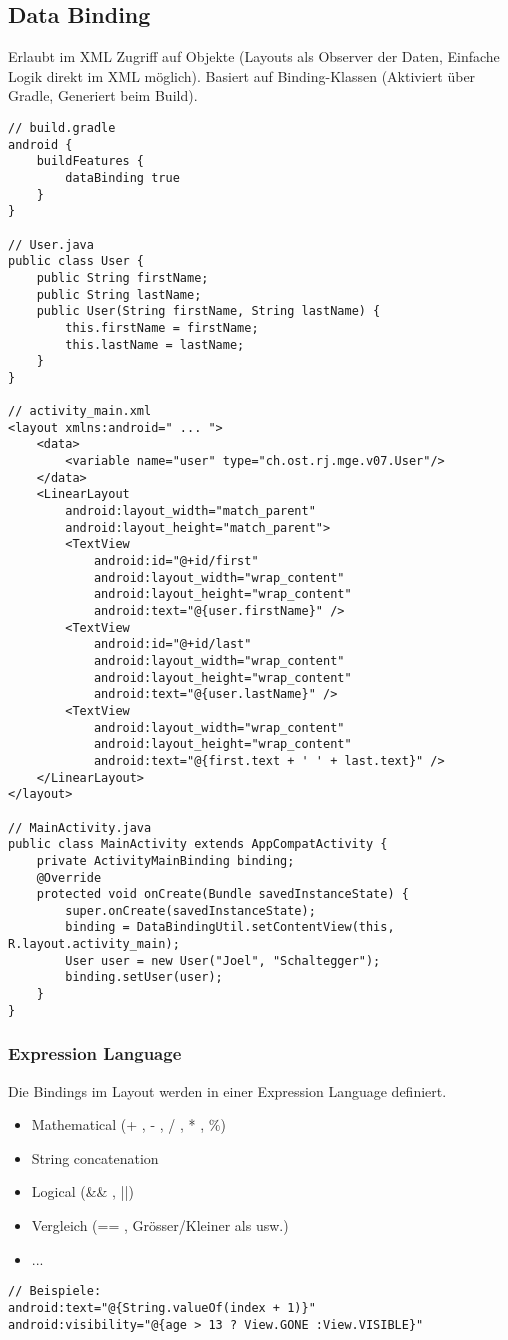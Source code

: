 \subsection{Data Binding}
Erlaubt im XML Zugriff auf Objekte (Layouts als Observer der Daten, Einfache Logik direkt im XML möglich). Basiert auf Binding-Klassen (Aktiviert über Gradle, Generiert beim Build).
\begin{lstlisting}
// build.gradle
android {
    buildFeatures {
        dataBinding true
    }
}

// User.java
public class User {
    public String firstName;
    public String lastName;
    public User(String firstName, String lastName) {
        this.firstName = firstName;
        this.lastName = lastName;
    }
}

// activity_main.xml
<layout xmlns:android=" ... ">
    <data>
        <variable name="user" type="ch.ost.rj.mge.v07.User"/>
    </data>
    <LinearLayout
        android:layout_width="match_parent"
        android:layout_height="match_parent">
        <TextView
            android:id="@+id/first"
            android:layout_width="wrap_content"
            android:layout_height="wrap_content"
            android:text="@{user.firstName}" />
        <TextView
            android:id="@+id/last"
            android:layout_width="wrap_content"
            android:layout_height="wrap_content"
            android:text="@{user.lastName}" />
        <TextView
            android:layout_width="wrap_content"
            android:layout_height="wrap_content"
            android:text="@{first.text + ' ' + last.text}" />
    </LinearLayout>
</layout>

// MainActivity.java
public class MainActivity extends AppCompatActivity {
    private ActivityMainBinding binding;
    @Override
    protected void onCreate(Bundle savedInstanceState) {
        super.onCreate(savedInstanceState);
        binding = DataBindingUtil.setContentView(this, R.layout.activity_main);
        User user = new User("Joel", "Schaltegger");
        binding.setUser(user);
    }
}
\end{lstlisting}
\subsubsection{Expression Language}
Die Bindings im Layout werden in einer Expression Language definiert.
\begin{itemize}[topsep=0pt, leftmargin=4mm]
    \setlength\itemsep{-0.3em}
    \item Mathematical (+ , - , / , * , \%)
    \item String concatenation
    \item Logical (\&\& , ||)
    \item Vergleich (== , Grösser/Kleiner als usw.)
    \item ...
\end{itemize}
\pagebreak
\begin{lstlisting}
// Beispiele:
android:text="@{String.valueOf(index + 1)}"
android:visibility="@{age > 13 ? View.GONE :View.VISIBLE}"
\end{lstlisting}

